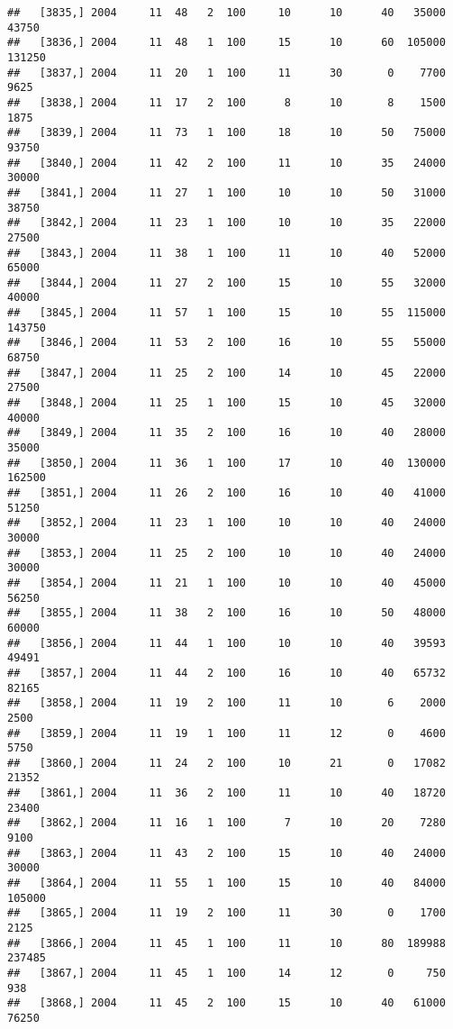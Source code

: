 \documentclass{article}\usepackage[]{graphicx}\usepackage[]{color}
\makeatletter
\newenvironment{kframe}{%
 \def\at@end@of@kframe{}%
 \ifinner\ifhmode%
  \def\at@end@of@kframe{\end{minipage}}%
  \begin{minipage}{\columnwidth}%
 \fi\fi%
 \def\FrameCommand##1{\hskip\@totalleftmargin \hskip-\fboxsep
 \colorbox{shadecolor}{##1}\hskip-\fboxsep
     \hskip-\linewidth \hskip-\@totalleftmargin \hskip\columnwidth}%
 \MakeFramed {\advance\hsize-\width
   \@totalleftmargin\z@ \linewidth\hsize
   \@setminipage}}%
 {\par\unskip\endMakeFramed%
 \at@end@of@kframe}
\newenvironment{knitrout}{}{} %
\makeatother
\begin{document}
\begin{knitrout}
\begin{kframe}
\begin{verbatim}
##   [3835,] 2004     11  48   2  100     10      10      40   35000   43750
##   [3836,] 2004     11  48   1  100     15      10      60  105000  131250
##   [3837,] 2004     11  20   1  100     11      30       0    7700    9625
##   [3838,] 2004     11  17   2  100      8      10       8    1500    1875
##   [3839,] 2004     11  73   1  100     18      10      50   75000   93750
##   [3840,] 2004     11  42   2  100     11      10      35   24000   30000
##   [3841,] 2004     11  27   1  100     10      10      50   31000   38750
##   [3842,] 2004     11  23   1  100     10      10      35   22000   27500
##   [3843,] 2004     11  38   1  100     11      10      40   52000   65000
##   [3844,] 2004     11  27   2  100     15      10      55   32000   40000
##   [3845,] 2004     11  57   1  100     15      10      55  115000  143750
##   [3846,] 2004     11  53   2  100     16      10      55   55000   68750
##   [3847,] 2004     11  25   2  100     14      10      45   22000   27500
##   [3848,] 2004     11  25   1  100     15      10      45   32000   40000
##   [3849,] 2004     11  35   2  100     16      10      40   28000   35000
##   [3850,] 2004     11  36   1  100     17      10      40  130000  162500
##   [3851,] 2004     11  26   2  100     16      10      40   41000   51250
##   [3852,] 2004     11  23   1  100     10      10      40   24000   30000
##   [3853,] 2004     11  25   2  100     10      10      40   24000   30000
##   [3854,] 2004     11  21   1  100     10      10      40   45000   56250
##   [3855,] 2004     11  38   2  100     16      10      50   48000   60000
##   [3856,] 2004     11  44   1  100     10      10      40   39593   49491
##   [3857,] 2004     11  44   2  100     16      10      40   65732   82165
##   [3858,] 2004     11  19   2  100     11      10       6    2000    2500
##   [3859,] 2004     11  19   1  100     11      12       0    4600    5750
##   [3860,] 2004     11  24   2  100     10      21       0   17082   21352
##   [3861,] 2004     11  36   2  100     11      10      40   18720   23400
##   [3862,] 2004     11  16   1  100      7      10      20    7280    9100
##   [3863,] 2004     11  43   2  100     15      10      40   24000   30000
##   [3864,] 2004     11  55   1  100     15      10      40   84000  105000
##   [3865,] 2004     11  19   2  100     11      30       0    1700    2125
##   [3866,] 2004     11  45   1  100     11      10      80  189988  237485
##   [3867,] 2004     11  45   1  100     14      12       0     750     938
##   [3868,] 2004     11  45   2  100     15      10      40   61000   76250

\end{verbatim}
\end{kframe}
\end{knitrout}
\end{document}
